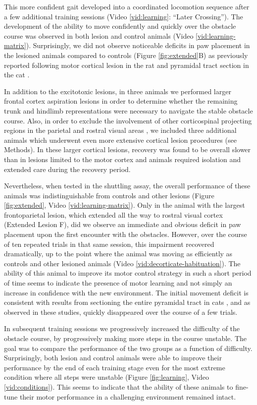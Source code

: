 This more confident gait developed into a coordinated locomotion sequence after a few additional training sessions (Video \ref{vid:learning}: ``Later Crossing''). The development of the ability to move confidently and quickly over the obstacle course was observed in both lesion and control animals (Video \ref{vid:learning-matrix}). Surprisingly, we did not observe noticeable deficits in paw placement in the lesioned animals compared to controls (Figure \ref{fig:extended}B) as previously reported following motor cortical lesion in the rat \cite{Metz2002} and pyramidal tract section in the cat \cite{Liddell1944}.

In addition to the excitotoxic lesions, in three animals we performed larger frontal cortex aspiration lesions in order to determine whether the remaining trunk and hindlimb representations were necessary to navigate the stable obstacle course. Also, in order to exclude the involvement of other corticospinal projecting regions in the parietal and rostral visual areas \cite{Miller1987}, we included three additional animals which underwent even more extensive cortical lesion procedures (see Methods). In these larger cortical lesions, recovery was found to be overall slower than in lesions limited to the motor cortex and animals required isolation and extended care during the recovery period.

Nevertheless, when tested in the shuttling assay, the overall performance of these animals was indistinguishable from controls and other lesions (Figure \ref{fig:extended}, Video \ref{vid:learning-matrix}). Only in the animal with the largest frontoparietal lesion, which extended all the way to rostral visual cortex (Extended Lesion F), did we observe an immediate and obvious deficit in paw placement upon the first encounter with the obstacles. However, over the course of ten repeated trials in that same session, this impairment recovered dramatically, up to the point where the animal was moving as efficiently as controls and other lesioned animals (Video \ref{vid:decorticate-habituation}). The ability of this animal to improve its motor control strategy in such a short period of time seems to indicate the presence of motor learning and not simply an increase in confidence with the new environment. The initial movement deficit is consistent with results from sectioning the entire pyramidal tract in cats \cite{Liddell1944}, and as observed in these studies, quickly disappeared over the course of a few trials.

In subsequent training sessions we progressively increased the difficulty of the obstacle course, by progressively making more steps in the course unstable. The goal was to compare the performance of the two groups as a function of difficulty. Surprisingly, both lesion and control animals were able to improve their performance by the end of each training stage even for the most extreme condition where all steps were unstable (Figure \ref{fig:learning}, Video \ref{vid:conditions}). This seems to indicate that the ability of these animals to fine-tune their motor performance in a challenging environment remained intact.

